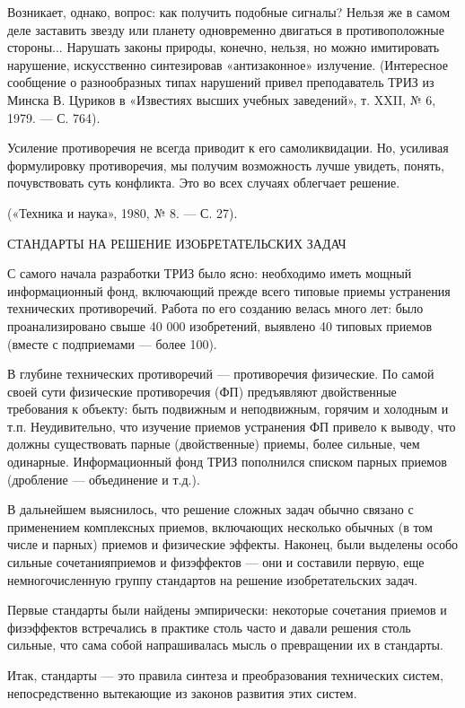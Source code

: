Возникает, однако,  вопрос: как  получить подобные сигналы?  Нельзя же
в  самом  деле заставить  звезду  или  планету одновременно  двигаться
в  противоположные   стороны...  Нарушать  законы   природы,  конечно,
нельзя,  но  можно  имитировать нарушение,  искусственно  синтезировав
«антизаконное» излучение. (Интересное  сообщение о разнообразных типах
нарушений привел преподаватель ТРИЗ из  Минска В. Цуриков в «Известиях
высших учебных заведений», т. XXII, № 6, 1979. — С. 764).

Усиление  противоречия не  всегда приводит  к его  самоликвидации. Но,
усиливая  формулировку  противоречия,  мы  получим  возможность  лучше
увидеть,  понять, почувствовать  суть конфликта.  Это во  всех случаях
облегчает решение.

(«Техника и наука», 1980, № 8. — С. 27).


СТАНДАРТЫ НА РЕШЕНИЕ ИЗОБРЕТАТЕЛЬСКИХ ЗАДАЧ


С самого  начала разработки  ТРИЗ было  ясно: необходимо  иметь мощный
информационный фонд, включающий прежде всего типовые приемы устранения
технических  противоречий. Работа  по его  созданию велась  много лет:
было проанализировано  свыше 40  000 изобретений, выявлено  40 типовых
приемов (вместе с подприемами — более 100).

В глубине технических противоречий — противоречия физические. По самой
своей  сути  физические  противоречия  (ФП)  предъявляют  двойственные
требования к объекту: быть подвижным и неподвижным, горячим и холодным
и т.п.  Неудивительно, что  изучение приемов  устранения ФП  привело к
выводу, что  должны существовать  парные (двойственные)  приемы, более
сильные, чем  одинарные. Информационный  фонд ТРИЗ  пополнился списком
парных приемов (дробление — объединение и т.д.).

В дальнейшем  выяснилось, что решение  сложных задач обычно  связано с
применением комплексных  приемов, включающих несколько обычных  (в том
числе и парных)  приемов и физические эффекты.  Наконец, были выделены
особо сильные сочетанияприемов и физэффектов — они и составили первую,
еще  немногочисленную группу  стандартов  на решение  изобретательских
задач.

Первые стандарты были найдены эмпирически: некоторые сочетания приемов
и  физэффектов встречались  в практике  столь часто  и давали  решения
столь сильные, что  сама собой напрашивалась мысль о  превращении их в
стандарты.

Итак,  стандарты —  это правила  синтеза и  преобразования технических
систем, непосредственно вытекающие из законов развития этих систем.

